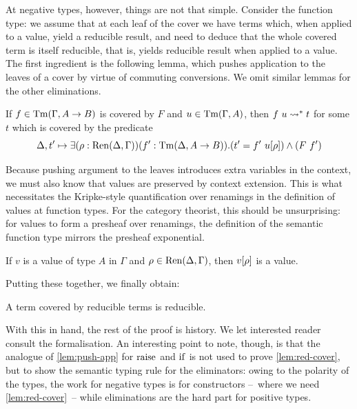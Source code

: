 \documentclass[a4paper,UKenglish,cleveref, autoref, thm-restate]{lipics-v2021}
\begin{document}
At negative types, however, things are not that simple. Consider the function type:
we assume that at each leaf of the cover we have terms which, when applied to
a value, yield a reducible result, and need to deduce that the whole covered term
is itself reducible, that is, yields reducible result when applied to a value.
The first ingredient is the following lemma, which pushes application
to the leaves of a cover by virtue of commuting conversions.
We omit similar lemmas for the other eliminations.

\begin{lemma}
  \label{lem:push-app}
  If \(f \in \Tm(\Gamma,A\to B)\) is covered by \(F\) and \(u \in \Tm(\Gamma,A)\),
  then \(f~u \rightsquigarrow^* t\) for some \(t\) which is covered by the predicate
  \[\Delta,t' \mapsto \exists (\rho : \Ren(\Delta,\Gamma)) (f' : \Tm(\Delta,A \to B)).
  (t' = f'~\subs{u}{\rho}) \wedge (F~f')\]
\end{lemma}

Because pushing argument to the leaves introduces extra variables
in the context, we must also know that values are preserved by context extension.
This is what necessitates the Kripke-style
quantification over renamings in the definition of values at function
types. For the category theorist, this should be
unsurprising: for values to form a presheaf over
renamings, the definition of the semantic function type mirrors
the presheaf exponential.

\begin{lemma}
  If \(v\) is a value of type \(A\) in \(\Gamma\) and \(\rho \in \Ren(\Delta,\Gamma)\),
  then \(\subs{v}{\rho}\) is a value.
\end{lemma}

Putting these together, we finally obtain:

\begin{lemma}
  \label{lem:red-cover}
  A term covered by reducible terms is reducible.
\end{lemma}

With this in hand, the rest of the proof is
history. We let interested reader consult the formalisation.
An interesting point to note, though, is that the analogue of \cref{lem:push-app}
for \(\rai\) and \(\iteop\) is not used to prove \cref{lem:red-cover}, but 
to show the semantic typing rule for
the eliminators: owing to the polarity of the types, the work for
negative types is for constructors --~where we need \cref{lem:red-cover}~--
while eliminations are the hard part for positive types.
\end{document}
